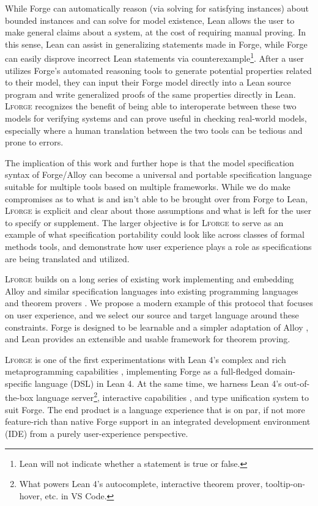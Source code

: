 While Forge can automatically reason (via solving for satisfying instances) about bounded instances and can solve for model existence, Lean allows the user to make general claims about a system, at the cost of requiring manual proving. In this sense, Lean can assist in generalizing statements made in Forge, while Forge can easily disprove incorrect Lean statements via counterexample\footnote{Lean will not indicate whether a statement is true or false.}. After a user utilizes Forge's automated reasoning tools to generate potential properties related to their model, they can input their Forge model directly into a Lean source program and write generalized proofs of the same properties directly in Lean. \textsc{Lforge} recognizes the benefit of being able to interoperate between these two models for verifying systems and can prove useful in checking real-world models, especially where a human translation between the two tools can be tedious and prone to errors. 

The implication of this work and further hope is that the model specification syntax of Forge/Alloy can become a universal and portable specification language suitable for multiple tools based on multiple frameworks. While we do make compromises as to what is and isn't able to be brought over from Forge to Lean, \textsc{Lforge} is explicit and clear about those assumptions and what is left for the user to specify or supplement. The larger objective is for \textsc{Lforge} to serve as an example of what specification portability could look like across classes of formal methods tools, and demonstrate how user experience plays a role as specifications are being translated and utilized. 

\textsc{Lforge} builds on a long series of existing work implementing and embedding Alloy and similar specification languages into existing programming languages \cite{milicevic2010executable,milicevic2014alpha,korner2022embedding,malik2010translating,mikhailov2002approach} and theorem provers \cite{arkoudas2004integrating,st2023comparison,krings2018translation}. We propose a modern example of this protocol that focuses on user experience, and we select our source and target language around these constraints. Forge is designed to be learnable and a simpler adaptation of Alloy \cite{ngpdbccdlrrvwwk-oopsla-2024}, and Lean provides an extensible \cite{nawrocki2023extensible,ullrich2023extensible} and usable \cite{ayers2021graphical} framework for theorem proving. 

\textsc{Lforge} is one of the first experimentations with Lean 4's complex and rich metaprogramming capabilities \cite{metaprogramming}, implementing Forge as a full-fledged domain-specific language (DSL) in Lean 4. At the same time, we harness Lean 4's out-of-the-box language server\footnote{What powers Lean 4's autocomplete, interactive theorem prover, tooltip-on-hover, etc. in VS Code.}, interactive capabilities \cite{nawrocki2023extensible}, and type unification system to suit Forge. The end product is a language experience that is on par, if not more feature-rich than native Forge support in an integrated development environment (IDE) from a purely user-experience perspective. 

